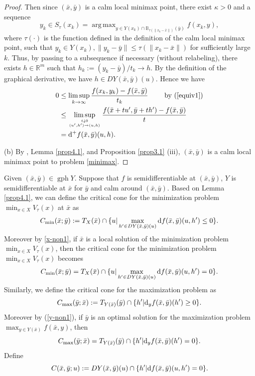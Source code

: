 \documentclass[11pt]{article}
\DeclareMathOperator*{\argmax}{arg\,max}
\numberwithin{equation}{section}
\begin{document}
{\begin{proof}
 Then since $(\bar x,\bar y)$ is a calm local minimax point, there exist $\kappa >0$ and a sequence
$$y_k \in S_{\tau}(x_k) = \argmax _{y \in Y(x_k)\cap \mathbb{B}_{\tau(\|x_k-\bar x\|)}(\bar{y})
	} f (x_k, y),$$
where $\tau(\cdot)$ is the function defined in the definition of the calm local minimax point,
such that $y_k \in Y(x_k), \|y_k-\bar y\| \leq \tau(\|x_k-\bar x\|)$ for sufficiently large $k$. Thus, by passing to a subsequence if necessary (without relabeling), there exists $h\in \mathbb{R}^m$ such that $h_k:=(y_k-\bar y)/t_k \to h$. By the definition of the graphical derivative, we have $h \in D Y(\bar{x}, \bar{y})(u)$.
Hence we have
\begin{eqnarray*}
\begin{aligned}
0 & \leq \limsup\limits_{k \to \infty} \frac{f (x_k, y_k )-f(\bar{x}, \bar{y})}{t_k}  \qquad \mbox{ by (\ref{equiv1})}\\
& \leq \limsup\limits_{{t \downarrow 0} \atop {(u',h') \to (u,h)}} \frac{f (\bar{x}+tu', \bar{y}+th' )-f(\bar{x}, \bar{y})}{t} \\
& = {\rm d}^+ f(\bar x,\bar y)(u,h).
\end{aligned}
\end{eqnarray*}

(b) By \cite[Proposition 2.8 (ii)]{Ma2023}, Lemma \ref{prop4.1}, and Proposition \ref{prop3.1} (iii), $(\bar x, \bar y)$ is a calm local minimax point to problem \eqref{minimax}.
\end{proof}


Given $(\bar x,\bar y)\in \operatorname{gph}Y$. Suppose that $f$ is semidifferentiable at $(\bar x,\bar y)$, $Y$ is semidifferentiable at $\bar x$ for $\bar y$ and calm around $(\bar x,\bar y)$. Based on Lemma \ref{prop4.1}, we can define the critical cone for the minimization problem $\min_{x\in X} V_\tau (x)$ at $\bar x$ as
 $$C_{\min}(\bar x; \bar y):=T_{ X}(\bar x) \cap \{u|\max_{h'\in DY(\bar x,\bar y)(u)}{\rm d} f(\bar x,\bar y)(u,h') \leq  0\}.$$ Moreover by \eqref{x-non1}, if $\bar x$ is a local solution of the minimization problem $\min_{x\in X} V_\tau (x)$, then
 the critical cone for the minimization problem $\min_{x\in X} V_\tau (x)$ becomes
 $$C_{\min}(\bar x; \bar y)=T_{ X}(\bar x) \cap \{u|\max_{h'\in DY(\bar x,\bar y)(u)}{\rm d} f(\bar x,\bar y)(u,h') =  0\}.$$
Similarly, we define the critical cone for the maximization problem as
$$C_{\max}(\bar y;\bar x):=T_{ Y(\bar x)}(\bar y) \cap \{h'|{\rm d}_y f(\bar x,\bar y)(h') \geq  0\}.$$
Moreover by (\ref{y-non1}), if $\bar y$ is  an optimal solution for the maximization problem $\max_{y\in Y(\bar x)} f(\bar x, y)$, then 
$$C_{\max}(\bar y;\bar x)=T_{ Y(\bar x)}(\bar y) \cap \{h'|{\rm d}_y f(\bar x,\bar y)(h') =  0\}.$$
Define
$$C(\bar x,\bar y;u):=D Y(\bar x,\bar y)(u)\cap \{h'| {\rm d}f(\bar x,\bar y)(u,h')=0\}.$$

}
\end{document}
